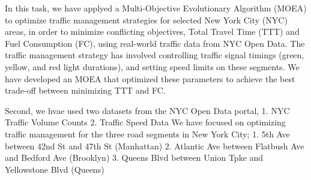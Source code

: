 In this task, we have applyed a Multi-Objective Evolutionary Algorithm (MOEA) to optimize traffic management
strategies for selected New York City (NYC) areas, in order to  minimize conflicting
objectives, Total Travel Time (TTT) and Fuel Consumption (FC), using real-world traffic data
from NYC Open Data. The traffic management strategy has involved controlling traffic signal timings (green, yellow, and 
red light durations), and setting speed limits on these segments. We have developed an MOEA that optimized these parameters to achieve the best trade-off 
between minimizing TTT and FC.



Second, we hvae used two datasets from the NYC Open Data portal,
1. NYC Traffic Volume Counts
2. Traffic Speed Data
We have focused on optimizing traffic management for the three road segments in New 
York City;  
1. 5th Ave between 42nd St and 47th St (Manhattan) 
2. Atlantic Ave between Flatbush Ave and Bedford Ave (Brooklyn) 
3. Queens Blvd between Union Tpke and Yellowstone Blvd (Queens) 





